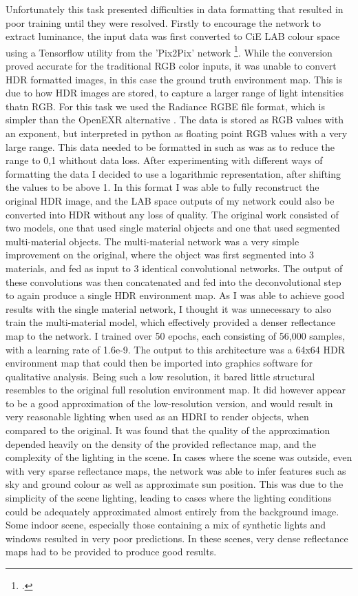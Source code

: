 \documentclass[ %
                    author={Gavin Parker},
                supervisor={Dr. Neill Campbell},
                    degree={MEng},
                     title={Deep Siamese Networks for Illumination Estimation from Stereo Images},
                  subtitle={},
                      type={research},
                      year={2018} ]{dissertation}
\begin{document}
Unfortunately this task presented difficulties in data formatting that resulted in poor training until they were resolved. Firstly to encourage the network to extract luminance, the input data was first converted to CiE LAB colour space using a Tensorflow utility from the 'Pix2Pix' network \footcite{https://github.com/affinelayer/pix2pix-tensorflow/blob/master/pix2pix.py}. While the conversion proved accurate for the traditional RGB color inputs, it was unable to convert HDR formatted images, in this case the ground truth environment map. This is due to how HDR images are stored, to capture a larger range of light intensities thatn RGB. For this task we used the Radiance RGBE file format, which is simpler than the OpenEXR alternative . The data is stored as RGB values with an exponent, but interpreted in python as floating point RGB values with a very large range. This data needed to be formatted in such as was as to reduce the range to 0,1 whithout data loss. After experimenting with different ways of formatting the data I decided to use a logarithmic representation, after shifting the values to be above 1. In this format I was able to fully reconstruct the original HDR image, and the LAB space outputs of my network could also be converted into HDR without any loss of quality.
\newline
The original work consisted of two models, one that used single material objects and one that used segmented multi-material objects. The multi-material network was a very simple improvement on the original, where the object was first segmented into 3 materials, and fed as input to 3 identical convolutional networks. The output of these convolutions was then concatenated and fed into the deconvolutional step to again produce a single HDR environment map. As I was able to achieve good results with the single material network, I thought it was unnecessary to also train the multi-material model, which effectively provided a denser reflectance map to the network. I trained over 50 epochs, each consisting of 56,000 samples, with a learning rate of 1.6e-9. The output to this architecture was a 64x64 HDR environment map that could then be imported into graphics software for qualitative analysis. Being such a low resolution, it bared little structural resembles to the original full resolution environment map. It did however appear to be a good approximation of the low-resolution version, and would result in very reasonable lighting when used as an HDRI to render objects, when compared to the original. It was found that the quality of the approximation depended heavily on the density of the provided reflectance map, and the complexity of the lighting in the scene. In cases where the scene was outside, even with very sparse reflectance maps, the network was able to infer features such as sky and ground colour as well as approximate sun position. This was due to the simplicity of the scene lighting, leading to cases where the lighting conditions could be adequately approximated almost entirely from the background image. Some indoor scene, especially those containing a mix of synthetic lights and windows resulted in very poor predictions. In these scenes, very dense reflectance maps had to be provided to produce good results. 
\end{document}
